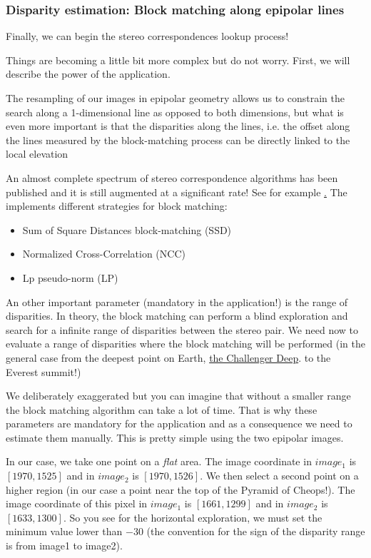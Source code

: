 \subsubsection{Disparity estimation: Block matching along epipolar lines}

Finally, we can begin the stereo correspondences lookup process! 

Things are becoming a little bit more complex but do not worry. First,
we will describe the power of the 
application.

The resampling of our images in epipolar geometry allows us to
constrain the search along a 1-dimensional line as opposed to both
dimensions, but what is even more important is that the disparities
along the lines, i.e. the offset along the lines measured by the
block-matching process can be directly linked to the local elevation

An almost complete spectrum of stereo correspondence algorithms has been
published and it is still augmented at a significant rate!
See for example \href{http://en.wikipedia.org/wiki/Block-matching_algorithm}. The
\otb implements different strategies for block matching:

\begin{itemize}
\item Sum of Square Distances block-matching (SSD)
\item Normalized Cross-Correlation (NCC)
\item Lp pseudo-norm (LP)
\end{itemize}

An other important parameter (mandatory in the application!) is the
range of disparities. In theory, the block matching can perform a
blind exploration and search for a infinite range of disparities
between the stereo pair. We need now to evaluate a range of
disparities where the block matching will be performed (in the general
case from the deepest point on
Earth, \href{http://en.wikipedia.org/wiki/Challenger_Deep}{the
Challenger Deep}.  to the Everest summit!)

We deliberately exaggerated but you can imagine that without a smaller
range the block matching algorithm can take a lot of time.  That is why
these parameters are mandatory for the application and as a
consequence we need to estimate them manually. This is pretty simple
using the two epipolar images.

In our case, we take one point on a \textit{flat} area. The image coordinate in $image_{1}$
is $[1970,1525]$ and in $image_{2}$ is $[1970,1526]$. We then select a second
point on a higher region (in our case a point near the top of the Pyramid of
Cheops!). The image coordinate of this pixel in $image_{1}$ is $[1661,1299]$ and
in $image_{2}$ is $[1633,1300]$.  So you see for the horizontal exploration, we
must set the minimum value lower than $-30$ (the convention for the sign of the
disparity range is from image1 to image2).

